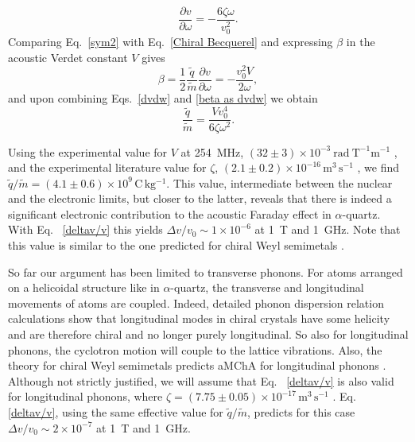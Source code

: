 \documentclass[prl,twocolumn]{revtex4-2}
\begin{document}
\begin{equation}
\frac{\partial v}{\partial \omega }=-\frac{6\zeta \omega }{v_{0}^{2}}.
\label{dvdw}
\end{equation}
Comparing Eq.~\eqref{sym2} with Eq.~\eqref{Chiral Becquerel} and expressing $
\beta $ in the acoustic Verdet constant $V$ \cite{Sup-mat} gives
\begin{equation}
\beta =\frac{1}{2}\frac{\widetilde{q}}{\widetilde{m}}\frac{\partial v}{
\partial \omega }=-\frac{v_{0}^{2}V}{2\omega },  \label{beta as dvdw}
\end{equation}
and upon combining Eqs.~\eqref{dvdw} and \eqref{beta as dvdw} we obtain
\begin{equation}
\frac{\widetilde{q}}{\widetilde{m}}=\frac{Vv_{0}^{4}}{6\zeta \omega ^{2}}.
\end{equation}

Using the experimental value for $V$ at \SI{254}{MHz}, $(32\pm3)
\times10^{-3}~\mathrm{rad\ T^{-1} m^{-1}}$ \cite{Sup-mat}, and the
experimental literature value for $\zeta$, $(2.1\pm0.2)\times 10^{-16}\,
\mathrm{m^{3}\,s^{-1}}$ \cite{Joffrin1980}, we find $\widetilde{q}/
\widetilde{m}=(4.1\pm0.6)\times 10^{9}\,\mathrm{C\,kg^{-1}}$. This value,
intermediate between the nuclear and the electronic limits, but closer to
the latter, reveals that there is indeed a significant electronic
contribution to the acoustic Faraday effect in $\alpha$-quartz. With Eq.~
\eqref{deltav/v} this yields $\Delta v/v_{0}\sim1\times 10^{-6}$ at \SI{1}{T}
and \SI{1}{GHz}. Note that this value is similar to the one predicted for
chiral Weyl semimetals \cite{Phonon-MChA-Weyl}.

So far our argument has been limited to transverse phonons. For atoms
arranged on a helicoidal structure like in $\alpha$-quartz, the transverse
and longitudinal movements of atoms are coupled. Indeed, detailed phonon
dispersion relation calculations \cite{Chiral-phonon-database} show that
longitudinal modes in chiral crystals have some helicity and are therefore
chiral and no longer purely longitudinal. So also for longitudinal phonons,
the cyclotron motion will couple to the lattice vibrations. Also, the theory
for chiral Weyl semimetals predicts aMChA for longitudinal phonons \cite
{Phonon-MChA-Weyl}. Although not strictly justified, we will assume that Eq.~
\eqref{deltav/v} is also valid for longitudinal phonons, where $\zeta =
(7.75\pm0.05)\times 10^{-17}\,\mathrm{m^{3}\,s^{-1}}$ \cite{Hao}. Eq.~
\eqref{deltav/v}, using the same effective value for $\widetilde{q}/
\widetilde{m}$, predicts for this case $\Delta v/v_{0}\sim2\times 10^{-7}$
at \SI{1}{T} and \SI{1}{GHz}.
\end{document}

